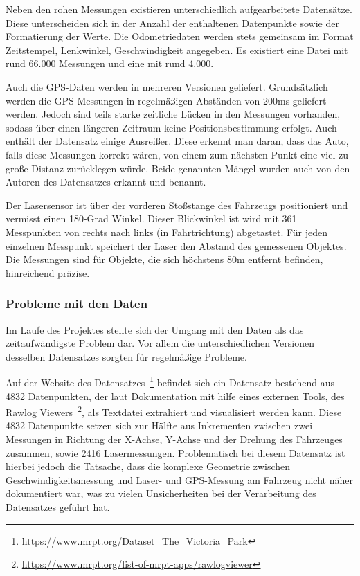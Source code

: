 \documentclass[11pt]{article}
\begin{document}
Neben den rohen Messungen existieren unterschiedlich aufgearbeitete Datensätze. Diese unterscheiden sich in der Anzahl der enthaltenen Datenpunkte sowie der Formatierung der Werte. Die Odometriedaten werden stets gemeinsam im Format {Zeitstempel, Lenkwinkel, Geschwindigkeit} angegeben. Es existiert eine Datei mit rund 66.000 Messungen und eine mit rund 4.000.

Auch die GPS-Daten werden in mehreren Versionen geliefert. Grundsätzlich werden die GPS-Messungen in regelmäßigen Abständen von 200ms geliefert werden. Jedoch sind teils starke zeitliche Lücken in den Messungen vorhanden, sodass über einen längeren Zeitraum keine Positionsbestimmung erfolgt. Auch enthält der Datensatz einige Ausreißer. Diese erkennt man daran, dass das Auto, falls diese Messungen korrekt wären, von einem zum nächsten Punkt eine viel zu große Distanz zurücklegen würde. Beide genannten Mängel wurden auch von den Autoren des Datensatzes erkannt und benannt.

Der Lasersensor ist über der vorderen Stoßstange des Fahrzeugs positioniert und vermisst einen 180-Grad Winkel. Dieser Blickwinkel ist wird mit 361 Messpunkten von rechts nach links (in Fahrtrichtung) abgetastet. Für jeden einzelnen Messpunkt speichert der Laser den Abstand des gemessenen Objektes. Die Messungen sind für Objekte, die sich höchstens 80m entfernt befinden, hinreichend präzise. 

\subsubsection{Probleme mit den Daten}
Im Laufe des Projektes stellte sich der Umgang mit den Daten als das zeitaufwändigste Problem dar. Vor allem die unterschiedlichen Versionen desselben Datensatzes sorgten für regelmäßige Probleme.

Auf der Website des Datensatzes~\footnote{\url{https://www.mrpt.org/Dataset_The_Victoria_Park}} befindet sich ein Datensatz bestehend aus 4832 Datenpunkten, der laut Dokumentation mit hilfe eines externen Tools, des Rawlog Viewers~\footnote{\url{https://www.mrpt.org/list-of-mrpt-apps/rawlogviewer}}, als Textdatei extrahiert und visualisiert werden kann. Diese 4832 Datenpunkte setzen sich zur Hälfte aus Inkrementen zwischen zwei Messungen in Richtung der X-Achse, Y-Achse und der Drehung des Fahrzeuges zusammen, sowie 2416 Lasermessungen. Problematisch bei diesem Datensatz ist hierbei jedoch die Tatsache, dass die komplexe Geometrie zwischen Geschwindigkeitsmessung und Laser- und GPS-Messung am Fahrzeug nicht näher dokumentiert war, was zu vielen Unsicherheiten bei der Verarbeitung des Datensatzes geführt hat. 
\end{document}
